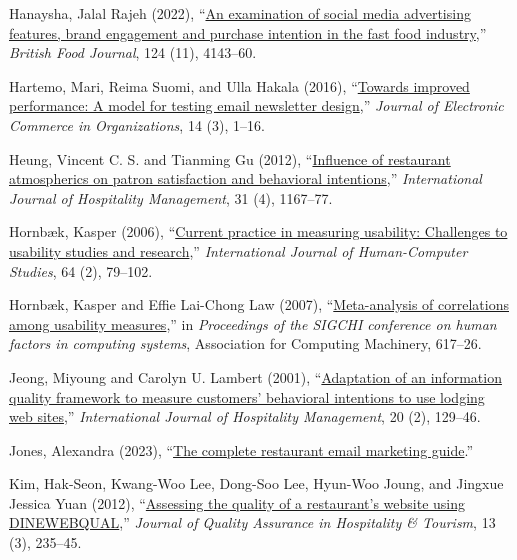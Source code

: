 \documentclass[
  12pt,
  letterpaper,
  DIV=11,
  numbers=noendperiod]{scrartcl}
\newlength{\cslhangindent}
\newenvironment{CSLReferences}[2] %
 {\begin{list}{}{%
  \setlength{\itemindent}{0pt}
  \setlength{\leftmargin}{0pt}
  \setlength{\parsep}{0pt}
  \ifodd #1
   \setlength{\leftmargin}{\cslhangindent}
   \setlength{\itemindent}{-1\cslhangindent}
  \fi
  \setlength{\itemsep}{#2\baselineskip}}}
 {\end{list}}
\begin{document}
\begin{CSLReferences}{1}{0}
Hanaysha, Jalal Rajeh (2022),
{``\href{https://doi.org/10.1108/BFJ-08-2021-0907}{An examination of
social media advertising features, brand engagement and purchase
intention in the fast food industry},''} \emph{British Food Journal},
124 (11), 4143--60.

Hartemo, Mari, Reima Suomi, and Ulla Hakala (2016),
{``\href{https://doi.org/10.4018/JECO.2016070101}{Towards improved
performance: A model for testing email newsletter design},''}
\emph{Journal of Electronic Commerce in Organizations}, 14 (3), 1--16.

Heung, Vincent C. S. and Tianming Gu (2012),
{``\href{https://doi.org/10.1016/j.ijhm.2012.02.004}{Influence of
restaurant atmospherics on patron satisfaction and behavioral
intentions},''} \emph{International Journal of Hospitality Management},
31 (4), 1167--77.

Hornbæk, Kasper (2006),
{``\href{https://doi.org/10.1016/j.ijhcs.2005.06.002}{Current practice
in measuring usability: Challenges to usability studies and
research},''} \emph{International Journal of Human-Computer Studies}, 64
(2), 79--102.

Hornbæk, Kasper and Effie Lai-Chong Law (2007),
{``\href{https://doi.org/10.1145/1240624.1240722}{Meta-analysis of
correlations among usability measures},''} in \emph{Proceedings of the
SIGCHI conference on human factors in computing systems}, Association
for Computing Machinery, 617--26.

Jeong, Miyoung and Carolyn U. Lambert (2001),
{``\href{https://doi.org/10.1016/S0278-4319(00)00041-4}{Adaptation of an
information quality framework to measure customers' behavioral
intentions to use lodging web sites},''} \emph{International Journal of
Hospitality Management}, 20 (2), 129--46.

Jones, Alexandra (2023),
{``\href{https://www.opentable.com/restaurant-solutions/resources/email-marketing-restaurants/}{The
complete restaurant email marketing guide}.''}

Kim, Hak-Seon, Kwang-Woo Lee, Dong-Soo Lee, Hyun-Woo Joung, and Jingxue
Jessica Yuan (2012),
{``\href{https://doi.org/10.1080/1528008X.2012.692278}{Assessing the
quality of a restaurant's website using DINEWEBQUAL},''} \emph{Journal
of Quality Assurance in Hospitality \& Tourism}, 13 (3), 235--45.


\end{CSLReferences}
\end{document}
